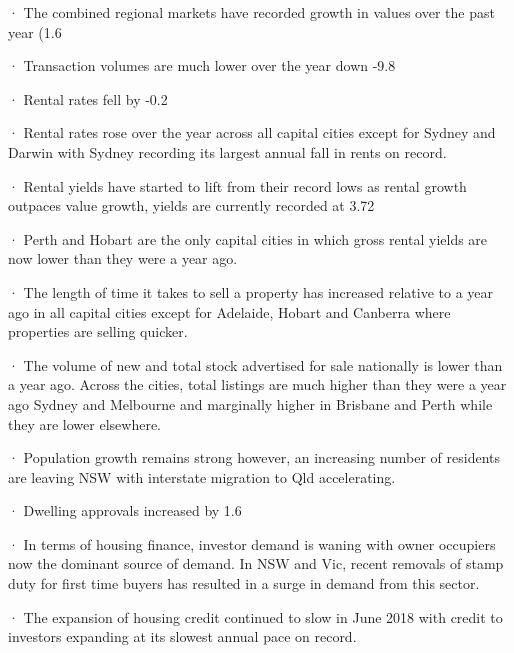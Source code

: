 ·       The combined regional markets have recorded growth in values over the past year (1.6%

·       Transaction volumes are much lower over the year down -9.8%

·       Rental rates fell by -0.2%

·       Rental rates rose over the year across all capital cities except for Sydney and Darwin with Sydney recording its largest annual fall in rents on record.

·       Rental yields have started to lift from their record lows as rental growth outpaces value growth, yields are currently recorded at 3.72%

·       Perth and Hobart are the only capital cities in which gross rental yields are now lower than they were a year ago.

·       The length of time it takes to sell a property has increased relative to a year ago in all capital cities except for Adelaide, Hobart and Canberra where properties are selling quicker.

·       The volume of new and total stock advertised for sale nationally is lower than a year ago.  Across the cities, total listings are much higher than they were a year ago Sydney and Melbourne and marginally higher in Brisbane and Perth while they are lower elsewhere.

·       Population growth remains strong however, an increasing number of residents are leaving NSW with interstate migration to Qld accelerating.

·       Dwelling approvals increased by 1.6%

·       In terms of housing finance, investor demand is waning with owner occupiers now the dominant source of demand.  In NSW and Vic, recent removals of stamp duty for first time buyers has resulted in a surge in demand from this sector.

·       The expansion of housing credit continued to slow in June 2018 with credit to investors expanding at its slowest annual pace on record.

